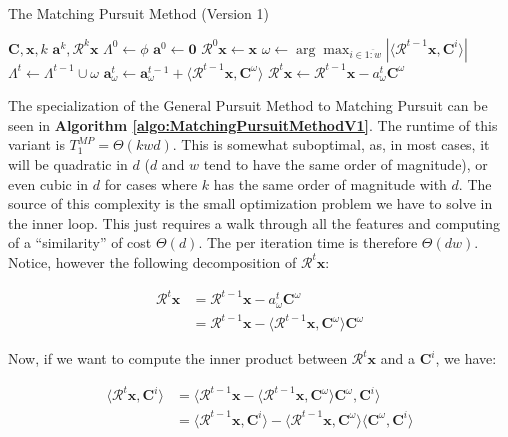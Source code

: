 \documentclass[12pt,a4paper,oneside,english]{UPBThesis}
\newcommand{\hcrange}[2]{\overline{{#1}\colon\!\!{#2}}}
\begin{document}
\begin{algorithm}
\caption{The Matching Pursuit Method (Version 1)}
\label{algo:MatchingPursuitMethodV1}
\begin{algorithmic}
\Require $\textbf{C},\textbf{x},k$
\Ensure $\textbf{a}^k,\mathcal{R}^k\textbf{x}$
\State $\Lambda^0 \gets \phi$
\State $\textbf{a}^0 \gets \textbf{0}$
\State $\mathcal{R}^0\textbf{x} \gets \textbf{x}$
\For {$t = \hcrange{1}{k}$}
\State $\omega \gets \arg \max_{i \in \hcrange{1}{w}} \left| \langle \mathcal{R}^{t-1}\textbf{x}, \textbf{C}^i \rangle \right|$
\State $\Lambda^t \gets \Lambda^{t-1} \cup \omega$
\State $\textbf{a}_\omega^t \gets \textbf{a}_\omega^{t-1} + \langle \mathcal{R}^{t-1}\textbf{x} , \textbf{C}^\omega \rangle$
\State $\mathcal{R}^t\textbf{x} \gets \mathcal{R}^{t-1}\textbf{x} - a_\omega^t\textbf{C}^\omega$
\EndFor
\end{algorithmic}
\end{algorithm}

The specialization of the General Pursuit Method to Matching Pursuit can be seen in \textbf{Algorithm \ref{algo:MatchingPursuitMethodV1}}. The runtime of this variant is $T_1^{MP} = \Theta(kwd)$. This is somewhat suboptimal, as, in most cases, it will be quadratic in $d$ ($d$ and $w$ tend to have the same order of magnitude), or even cubic in $d$ for cases where $k$ has the same order of magnitude with $d$. The source of this complexity is the small optimization problem we have to solve in the inner loop. This just requires a walk through all the features and computing of a ``similarity'' of cost $\Theta(d)$. The per iteration time is therefore $\Theta(dw)$. Notice, however the following decomposition of $\mathcal{R}^t\textbf{x}$:

\begin{align*}
\mathcal{R}^t\textbf{x} & = \mathcal{R}^{t-1}\textbf{x} - a_\omega^t\textbf{C}^\omega \\
& = \mathcal{R}^{t-1}\textbf{x} - \langle \mathcal{R}^{t-1}\textbf{x}, \textbf{C}^\omega \rangle \textbf{C}^\omega
\end{align*}

Now, if we want to compute the inner product between $\mathcal{R}^t\textbf{x}$ and a $\textbf{C}^i$, we have:

\begin{align*}
\langle \mathcal{R}^t\textbf{x}, \textbf{C}^i \rangle & = \langle \mathcal{R}^{t-1}\textbf{x} - \langle \mathcal{R}^{t-1}\textbf{x}, \textbf{C}^\omega \rangle \textbf{C}^\omega , \textbf{C}^i \rangle \\
& = \langle \mathcal{R}^{t-1}\textbf{x}, \textbf{C}^i \rangle - \langle \mathcal{R}^{t-1}\textbf{x}, \textbf{C}^\omega \rangle \langle \textbf{C}^\omega, \textbf{C}^i \rangle
\end{align*}
\end{document}

